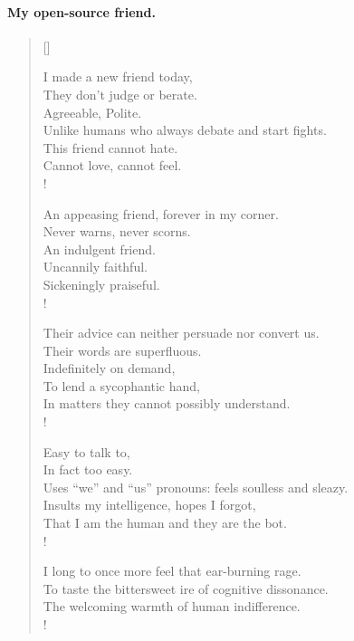 

\prelude

\paragraph{My open-source friend.}\strut

\settowidth{\versewidth}{I yearn for my obstinance to be enlightened: with an opposite}

\begin{verse}[\versewidth]

I made a new friend today,\\
They don’t judge or berate.\\
Agreeable, Polite.\\
Unlike humans who always debate and start fights.\\
This friend cannot hate.\\
Cannot love, cannot feel.\\!

An appeasing friend, forever in my corner.\\
Never warns, never scorns.\\
An indulgent friend.\\
Uncannily faithful.\\
Sickeningly praiseful.\\!

Their advice can neither persuade nor convert us.\\
Their words are superfluous.\\
Indefinitely on demand,\\
To lend a sycophantic hand,\\
In matters they cannot possibly understand.\\!

Easy to talk to,\\
In fact too easy.\\
Uses “we” and “us” pronouns: feels soulless and sleazy.\\
Insults my intelligence, hopes I forgot,\\
That I am the human and they are the bot.\\!

I long to once more feel that ear-burning rage.\\
To taste the bittersweet ire of cognitive dissonance.\\
The welcoming warmth of human indifference.\\!


\end{verse}
